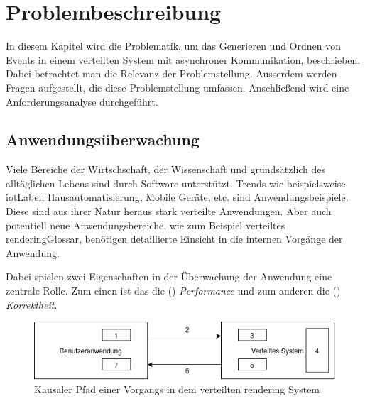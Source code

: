 %

\chapter{Problembeschreibung}
\label{chapter:Problembeschreibung}
In diesem Kapitel wird die Problematik, um das Generieren und Ordnen von Events in einem verteilten System mit asynchroner Kommunikation, beschrieben. Dabei betrachtet man die Relevanz der Problemstellung. Ausserdem werden Fragen aufgestellt, die diese Problemstellung umfassen. Anschließend wird eine Anforderungsanalyse durchgeführt.

\section{Anwendungsüberwachung}
\label{section:Tracing von Anwendungen}
Viele Bereiche der Wirtschschaft, der Wissenschaft und grundsätzlich des alltäglichen Lebens sind durch Software unterstützt. Trends wie beispielsweise \gls{iotLabel}, Hausautomatisierung, Mobile Geräte, etc. sind Anwendungsbeispiele. Diese sind aus ihrer Natur heraus stark verteilte Anwendungen. Aber auch potentiell neue Anwendungsbereiche, wie zum Beispiel verteiltes \gls{renderingGlossar}, benötigen detaillierte Einsicht in die internen Vorgänge der Anwendung. 

Dabei spielen zwei Eigenschaften in der Überwachung der Anwendung eine zentrale Rolle. 
Zum einen ist das die () \emph{Performance} und zum anderen die () \emph{Korrektheit}.

\begin{figure}[!ht]
	\centering
	\includegraphics[scale=0.5]{img/Problembeschreibung/Anwendungsueberwachung_Gesamtsystem.png}
	\caption[Kausaler Pfad einer Vorgangs in dem verteilten rendering System]{Kausaler Pfad einer Vorgangs in dem verteilten rendering System}
	\label{fig:Anwendungsueberwachung_Gesamtsystem}
\end{figure}


